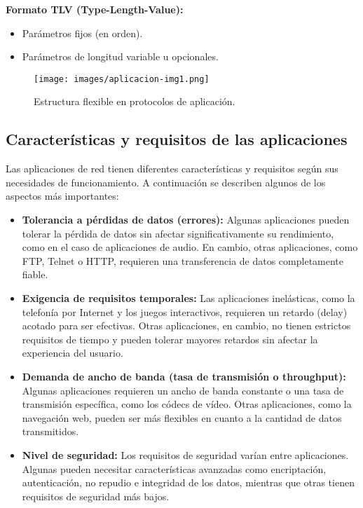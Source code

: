 \documentclass[a4paper,12pt]{article}
\begin{document}
\textbf{Formato TLV (Type-Length-Value):} 
\begin{itemize}
    \item Parámetros fijos (en orden).
    \item Parámetros de longitud variable u opcionales.
\end{itemize}

\begin{figure}[H]
    \centering
    \texttt{[image: images/aplicacion-img1.png]}
    \caption{Estructura flexible en protocolos de aplicación.}
    \label{fig:protocolo-aplicacion}
\end{figure}

\subsection{Características y requisitos de las aplicaciones}

Las aplicaciones de red tienen diferentes características y requisitos según sus necesidades de funcionamiento. A continuación se describen algunos de los aspectos más importantes:

\begin{itemize}
    \item \textbf{Tolerancia a pérdidas de datos (errores):} 
    Algunas aplicaciones pueden tolerar la pérdida de datos sin afectar significativamente su rendimiento, como en el caso de aplicaciones de audio. En cambio, otras aplicaciones, como FTP, Telnet o HTTP, requieren una transferencia de datos completamente fiable.
    
    \item \textbf{Exigencia de requisitos temporales:}
    Las aplicaciones inelásticas, como la telefonía por Internet y los juegos interactivos, requieren un retardo (delay) acotado para ser efectivas. Otras aplicaciones, en cambio, no tienen estrictos requisitos de tiempo y pueden tolerar mayores retardos sin afectar la experiencia del usuario.
    
    \item \textbf{Demanda de ancho de banda (tasa de transmisión o throughput):}
    Algunas aplicaciones requieren un ancho de banda constante o una tasa de transmisión específica, como los códecs de vídeo. Otras aplicaciones, como la navegación web, pueden ser más flexibles en cuanto a la cantidad de datos transmitidos.
    
    \item \textbf{Nivel de seguridad:}
    Los requisitos de seguridad varían entre aplicaciones. Algunas pueden necesitar características avanzadas como encriptación, autenticación, no repudio e integridad de los datos, mientras que otras tienen requisitos de seguridad más bajos.
\end{itemize}
\end{document}
